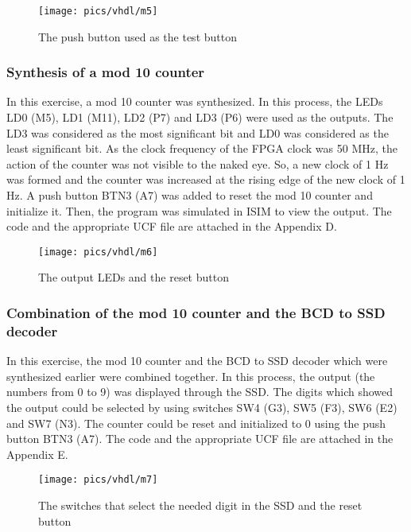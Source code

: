 \begin{figure}[!h]
	\centering
	\texttt{[image: pics/vhdl/m5]}
	\caption{The push button used as the test button}
	\label{fig:m5}
\end{figure}

\subsubsection{Synthesis of a mod 10 counter}

\noindent
In this exercise, a mod 10 counter was synthesized. In this process, the LEDs LD0 (M5), LD1 (M11), LD2 (P7) and LD3 (P6) were used as the outputs. The LD3 was considered as the  most significant bit and LD0 was considered as the least significant bit. As the clock frequency of the FPGA clock was 50 MHz, the action of the counter was not visible to the naked eye. So, a new clock of 1 Hz was formed and the counter was increased at the rising edge of the new clock of 1 Hz. A push button BTN3 (A7) was added to reset the  mod 10 counter and initialize it. Then, the program was simulated in ISIM to view the output. The  code and the appropriate UCF file are attached in the Appendix D.

\begin{figure}[!h]
	\centering
	\texttt{[image: pics/vhdl/m6]}
	\caption{The output LEDs and the reset button}
	\label{fig:m6}
\end{figure}

\subsubsection{Combination of the mod 10 counter and the BCD to SSD decoder}

\noindent
In this exercise, the mod 10 counter and the BCD to SSD decoder which were synthesized earlier were combined together. In this process, the output (the numbers from 0 to 9) was displayed through the SSD. The digits which showed the output could be selected by using switches SW4 (G3), SW5 (F3), SW6 (E2) and SW7 (N3). The  counter could be reset and initialized to 0 using the push button BTN3 (A7). The  code and the appropriate UCF file are attached in the Appendix E.

\begin{figure}[!h]
	\centering
	\texttt{[image: pics/vhdl/m7]}
	\caption{The switches that select the needed digit in the SSD and the reset button}
	\label{fig:m7}
\end{figure}

